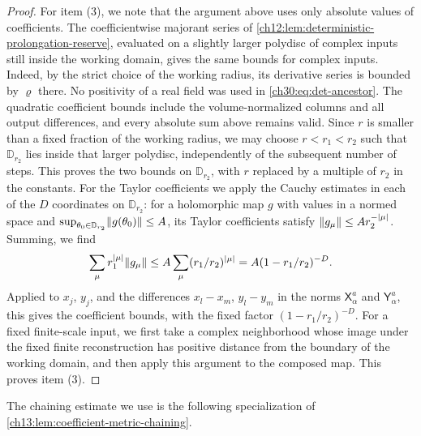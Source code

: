 \begin{proof}
For item (3), we note that the argument above uses only absolute values of coefficients. The coefficientwise majorant series of \cref{ch12:lem:deterministic-prolongation-reserve}, evaluated on a slightly larger polydisc of complex inputs still inside the working domain, gives the same bounds for complex inputs. Indeed, by the strict choice of the working radius, its derivative series is bounded by $\varrho$ there. No positivity of a real field was used in \eqref{ch30:eq:det-ancestor}. The quadratic coefficient bounds include the volume-normalized columns and all output differences, and every absolute sum above remains valid. Since $r$ is smaller than a fixed fraction of the working radius, we may choose $r<r_1<r_2$ such that $\mathbb D_{r_2}$ lies inside that larger polydisc, independently of the subsequent number of steps. This proves the two bounds on $\mathbb D_{r_2}$, with $r$ replaced by a multiple of $r_2$ in the constants. For the Taylor coefficients we apply the Cauchy estimates in each of the $D$ coordinates on $\mathbb D_{r_2}$: for a holomorphic map $g$ with values in a normed space and $\sup_{\theta_0\in\mathbb D_{r_2}}\lVert g(\theta_0)\rVert\le A$, its Taylor coefficients satisfy $\lVert g_\mu\rVert\le Ar_2^{-\lvert \mu\rvert}$. Summing, we find
\[
 \sum_\mu r_1^{\lvert \mu\rvert}\lVert g_\mu\rVert\le A\sum_\mu(r_1/r_2)^{\lvert \mu\rvert}=A(1-r_1/r_2)^{-D}.
\]
Applied to $x_j$, $y_j$, and the differences $x_l-x_m$, $y_l-y_m$ in the norms $\mathsf X_\alpha^a$ and $\mathsf Y_\alpha^a$, this gives the coefficient bounds, with the fixed factor $(1-r_1/r_2)^{-D}$. For a fixed finite-scale input, we first take a complex neighborhood whose image under the fixed finite reconstruction has positive distance from the boundary of the working domain, and then apply this argument to the composed map. This proves item (3).
\end{proof}

The chaining estimate we use is the following specialization of \cref{ch13:lem:coefficient-metric-chaining}.

